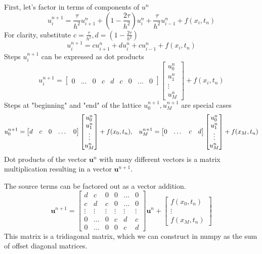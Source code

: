 First, let's factor in terms of components of $u^n$
$$u_i^{n+1} = \frac{\tau}{h^2}u_{i+1}^n + (1-\frac{2\tau}{h^2})u_i^n + \frac{\tau}{h^2}u_{i-1}^n + f(x_i,t_n)$$
For clarity, substitute $c = \frac{\tau}{h^2}, d = (1-\frac{2\tau}{h^2})$
$$u_i^{n+1} = cu_{i+1}^n + du_i^n + cu_{i-1}^n + f(x_i,t_n)$$
Steps $u_i^{n+1}$ can be expressed as dot products
$$
u_i^{n+1} =
\begin{bmatrix}
0 & \dots & 0 & c & d & c & 0 & \dots & 0
\end{bmatrix}
\begin{bmatrix}
u_0^n \\ u_1^n \\ \vdots \\ u_{M}^n
\end{bmatrix} + f(x_i,t_n)
$$
Steps at "beginning" and "end" of the lattice $u_0^{n+1}, u_{M}^{n+1}$ are special cases
$$
u_0^{n+1} =
\begin{bmatrix}
d & c & 0 & \dots & 0
\end{bmatrix}
\begin{bmatrix}
u_0^n \\ u_1^n \\ \vdots \\ u_{M}^n
\end{bmatrix} + f(x_0,t_n),\hspace{0.3cm}
u_{M}^{n+1} =
\begin{bmatrix}
0 & \dots & c & d
\end{bmatrix}
\begin{bmatrix}
u_0^n \\ u_1^n \\ \vdots \\ u_{M}^n
\end{bmatrix} + f(x_{M},t_n)
$$
Dot products of the vector $\mathbf{u}^n$ with many different vectors is a matrix multiplication resulting in a vector $\mathbf{u}^{n+1}$.

The source terms can be factored out as a vector addition.
$$
\mathbf{u}^{n+1}=
\begin{bmatrix}
d & c & 0 & 0 & \dots & 0 \\
c & d & c & 0 & \dots & 0 \\
\vdots & \vdots & \vdots & \vdots & \vdots & \vdots \\
0 & \dots & 0 & c & d & c \\
0 & \dots & 0 & 0 & c & d
\end{bmatrix}
\mathbf{u}^n +
\begin{bmatrix}
f(x_0,t_n) \\
\vdots \\
f(x_{M},t_n)
\end{bmatrix}
$$
This matrix is a tridiagonal matrix, which we can construct in numpy as the sum of offset diagonal matrices.